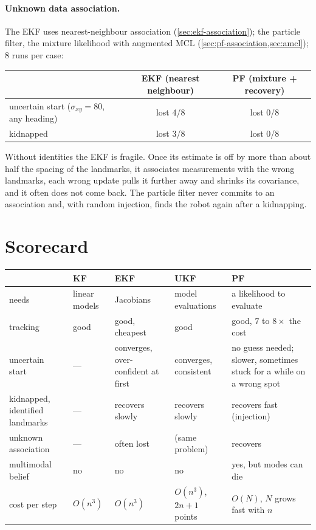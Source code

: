 \paragraph{Unknown data association.} The EKF uses nearest-neighbour
association (\cref{sec:ekf-association}); the particle filter, the
mixture likelihood with augmented MCL (\cref{sec:pf-association,sec:amcl});
8 runs per case:
\begin{center}
\begin{tabular}{@{}lcc@{}}
\toprule
& EKF (nearest neighbour) & PF (mixture + recovery)\\
\midrule
uncertain start ($\sigma_{xy}=80$, any heading) & lost 4/8 & lost 0/8\\
kidnapped & lost 3/8 & lost 0/8\\
\bottomrule
\end{tabular}
\end{center}
Without identities the EKF is fragile. Once its estimate is off by more
than about half the spacing of the landmarks, it associates measurements
with the wrong landmarks, each wrong update pulls it further away and
shrinks its covariance, and it often does not come back. The particle filter
never commits to an association and, with random injection, finds the
robot again after a kidnapping.

\section{Scorecard}

\begin{center}
\small
\begin{tabular}{@{}p{3.3cm}p{2.2cm}p{2.6cm}p{2.6cm}p{2.9cm}@{}}
\toprule
& KF & EKF & UKF & PF\\
\midrule
needs & linear models & Jacobians & model evaluations &
  a likelihood to evaluate\\
tracking & good & good, cheapest & good & good, $7$ to $8\times$ the cost\\
uncertain start & --- & converges, over-confident at first &
  converges, consistent & no guess needed; slower, sometimes stuck for a
  while on a wrong spot\\
kidnapped, identified landmarks & --- & recovers slowly & recovers
  slowly & recovers fast (injection)\\
unknown association & --- & often lost & (same problem) & recovers\\
multimodal belief & no & no & no & yes, but modes can die\\
cost per step & $O(n^3)$ & $O(n^3)$ & $O(n^3)$, $2n+1$ points &
  $O(N)$, $N$ grows fast with $n$\\
\bottomrule
\end{tabular}
\end{center}

